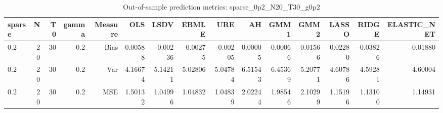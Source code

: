 \begin{table}[!htbp]\centering
\caption{Out-of-sample prediction metrics: sparse_0p2_N20_T30_g0p2}
\label{tab:table3_sparse_0p2_N20_T30_g0p2}
\begin{tabular}{lrrrrrrrrrrrrrr}
\hline
sparse & N & T0 & gamma & Measure & OLS & LSDV & EBMLE & URE & AH & GMM1 & GMM2 & LASSO & RIDGE & ELASTIC_NET \\
\hline
0.2 & 20 & 30 & 0.2 & Bias & 0.00588 & -0.00236 & -0.00275 & -0.00205 & 0.00005 & -0.00066 & 0.01566 & 0.02280 & -0.03826 & 0.01880 \\
0.2 & 20 & 30 & 0.2 & Var & 4.16674 & 5.14211 & 5.02806 & 5.04784 & 6.51543 & 6.45369 & 5.20771 & 4.60786 & 4.59281 & 4.60004 \\
0.2 & 20 & 30 & 0.2 & MSE & 1.50132 & 1.04996 & 1.04832 & 1.04839 & 2.02244 & 1.98546 & 2.10299 & 1.15196 & 1.13100 & 1.14931 \\
\hline
\end{tabular}
\end{table}


